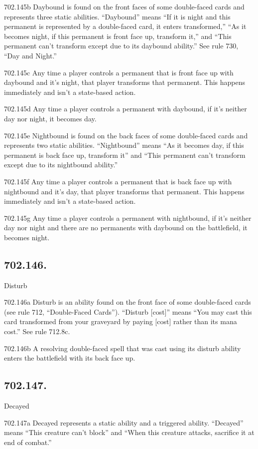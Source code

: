 702.145b Daybound is found on the front faces of some double-faced cards and represents three static abilities. “Daybound” means “If it is night and this permanent is represented by a double-faced card, it enters transformed,” “As it becomes night, if this permanent is front face up, transform it,” and “This permanent can’t transform except due to its daybound ability.” See rule 730, “Day and Night.”

702.145c Any time a player controls a permanent that is front face up with daybound and it’s night, that player transforms that permanent. This happens immediately and isn’t a state-based action.

702.145d Any time a player controls a permanent with daybound, if it’s neither day nor night, it becomes day.

702.145e Nightbound is found on the back faces of some double-faced cards and represents two static abilities. “Nightbound” means “As it becomes day, if this permanent is back face up, transform it” and “This permanent can’t transform except due to its nightbound ability.”

702.145f Any time a player controls a permanent that is back face up with nightbound and it’s day, that player transforms that permanent. This happens immediately and isn’t a state-based action.

702.145g Any time a player controls a permanent with nightbound, if it’s neither day nor night and there are no permanents with daybound on the battlefield, it becomes night.

\subsection*{702.146.}
Disturb

702.146a Disturb is an ability found on the front face of some double-faced cards (see rule 712, “Double-Faced Cards”). “Disturb [cost]” means “You may cast this card transformed from your graveyard by paying [cost] rather than its mana cost.” See rule 712.8c.

702.146b A resolving double-faced spell that was cast using its disturb ability enters the battlefield with its back face up.

\subsection*{702.147.}
Decayed

702.147a Decayed represents a static ability and a triggered ability. “Decayed” means “This creature can’t block” and “When this creature attacks, sacrifice it at end of combat.”

